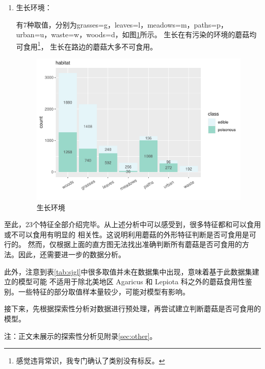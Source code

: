 \documentclass[lang=cn,11pt,a4paper,cite=super]{elegantpaper}
\begin{document}
\begin{enumerate}
   \item 生长环境：\par 有7种取值，分别为grasses=g，leaves=l，meadows=m，paths=p，
   urban=u，waste=w，woods=d，如图\ref{fig:szhj}所示。
   生长在有污染的环境的蘑菇均可食用\footnote{感觉违背常识，我专门确认了类别没有标反。}，
   生长在路边的蘑菇大多不可食用。
\begin{figure}[phtb]
   \centering
   \includegraphics[width=0.8\linewidth]{img/habitat-1.pdf}  
   \caption{生长环境}
   \label{fig:szhj}
\end{figure}
\end{enumerate}

\par 至此，23个特征全部介绍完毕。从上述分析中可以感受到，很多特征都和可以食用或不可以食用有明显的
相关性。这说明利用蘑菇的外形特征判断是否可食用是可行的。
然而，仅根据上面的直方图无法找出准确判断所有蘑菇是否可食用的方法。因此，还需要进一步的数据分析。
\par 此外，注意到表\ref{tab:sjgl}中很多取值并未在数据集中出现，意味着基于此数据集建立的模型可能
不适用于除北美地区 Agaricus 和 Lepiota 科之外的蘑菇食用性鉴别。一些特征的部分取值样本量较少，可能对模型有影响。
\par 接下来，先根据探索性分析对数据进行预处理，再尝试建立判断蘑菇是否可食用的模型。
\par 注：正文未展示的探索性分析见附录\ref{sec:other}。
\end{document}
